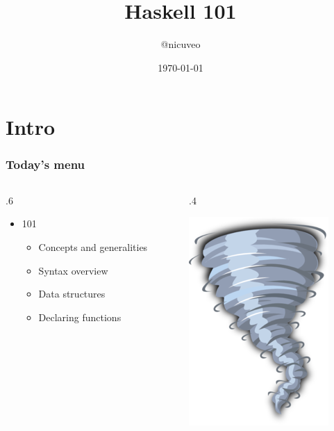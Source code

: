 \documentclass[17pt]{beamer}
\title{Haskell 101}
\author{@nicuveo}
\date{\small\today}
\renewcommand{\(}[1]{\begin{columns}[#1]}
\renewcommand{\)}{\end{columns}}
\newcommand{\<}[1]{\begin{column}{#1}}
\renewcommand{\>}{\end{column}}
\begin{document}

\togglefalse{showpagenumber}
\begin{frame}[fragile]
  \titlepage
\end{frame}
\toggletrue{showpagenumber}
\setcounter{framenumber}{0}




\section{Intro}

\begin{frame}
  \frametitle{Today's menu}
  \({c}
  \<{.6\textwidth}
  \begin{center}
  \begin{itemize}
  \item 101
    \begin{itemize}
    \item Concepts and generalities
    \item Syntax overview
    \item Data structures
    \item Declaring functions
    \end{itemize}
  \end{itemize}
  \end{center}
  \>
  \<{.4\textwidth}
  \begin{center}
    \includegraphics[width=.5\textwidth]{img/whirlwind}
  \end{center}
  \>
  \)
\end{frame}
\end{document}
